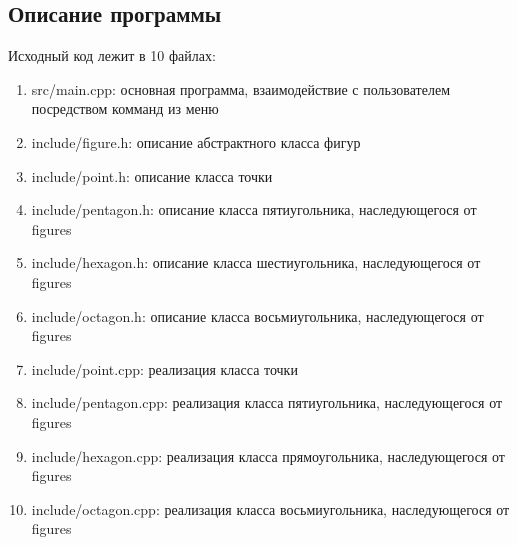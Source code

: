 \documentclass[12pt]{article}
\begin{document}
\subsection*{Описание программы}

Исходный код лежит в 10 файлах:
\begin{enumerate}
\item src/main.cpp: основная программа, взаимодействие с пользователем посредством комманд из меню

\item include/figure.h:    описание абстрактного класса фигур

\item include/point.h:     описание класса точки
\item include/pentagon.h:  описание класса пятиугольника, наследующегося от figures
\item include/hexagon.h: описание класса шестиугольника, наследующегося от figures
\item include/octagon.h:    описание класса восьмиугольника, наследующегося от figures

\item include/point.cpp:     реализация класса точки
\item include/pentagon.cpp:  реализация класса пятиугольника, наследующегося от figures
\item include/hexagon.cpp: реализация класса прямоугольника, наследующегося от figures
\item include/octagon.cpp:    реализация класса восьмиугольника, наследующегося от figures

\end{enumerate}
\end{document}
